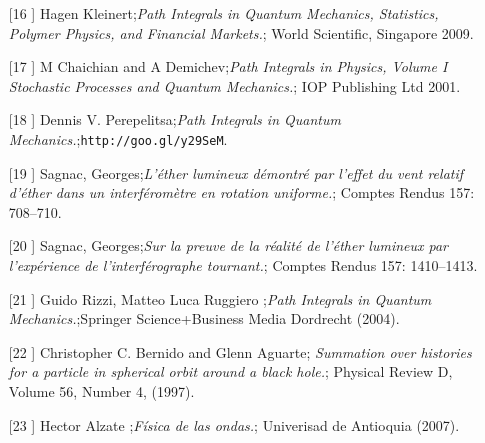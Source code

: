 \begin{itemize}
\item[[16]]  Hagen Kleinert;\textit{Path Integrals in Quantum Mechanics, Statistics, Polymer Physics, and Financial Markets.};  World Scientific, Singapore 2009.
\item[[17]]  M Chaichian and A Demichev;\textit{Path Integrals in Physics, Volume I
Stochastic Processes and Quantum Mechanics.};  IOP Publishing Ltd 2001.
\item[[18]] Dennis V. Perepelitsa;\textit{Path Integrals in Quantum Mechanics.};\texttt{http://goo.gl/y29SeM}.
\item[[19]] Sagnac, Georges;\textit{L'éther lumineux démontré par l'effet du vent relatif d'éther dans un interféromètre en rotation uniforme.}; Comptes Rendus 157: 708–710.
\item[[20]] Sagnac, Georges;\textit{Sur la preuve de la réalité de l'éther lumineux par l'expérience de l'interférographe tournant.};  Comptes Rendus 157: 1410–1413.
\item[[21]] Guido Rizzi, Matteo Luca Ruggiero ;\textit{Path Integrals in Quantum Mechanics.};Springer Science+Business Media Dordrecht (2004).
\item [[22]] Christopher C. Bernido and Glenn Aguarte; \textit{Summation over histories for a particle in spherical orbit around a black hole.};  Physical Review D, Volume 56, Number 4, (1997).
\item[[23]] Hector Alzate ;\textit{Física de las ondas.}; Univerisad de Antioquia (2007).
\end{itemize}
